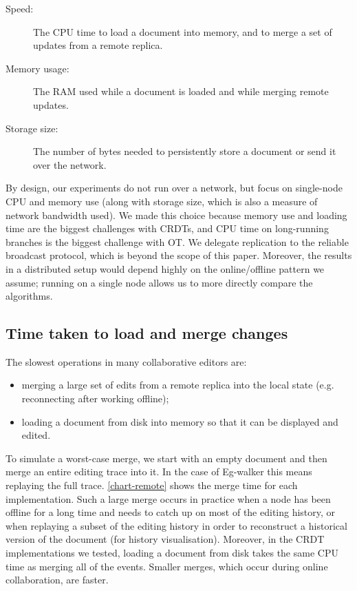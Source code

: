 \documentclass[sigplan,10pt]{acmart}
\newcommand{\algname}{Eg-walker\xspace}
\begin{document}
\begin{description}
\item[Speed:] The CPU time to load a document into memory, and to merge a set of updates from a remote replica.
\item[Memory usage:] The RAM used while a document is loaded and while merging remote updates.
\item[Storage size:] The number of bytes needed to persistently store a document or send it over the network.
\end{description}

By design, our experiments do not run over a network, but focus on single-node CPU and memory use (along with storage size, which is also a measure of network bandwidth used).
We made this choice because memory use and loading time are the biggest challenges with CRDTs, and CPU time on long-running branches is the biggest challenge with OT.
We delegate replication to the reliable broadcast protocol, which is beyond the scope of this paper.
Moreover, the results in a distributed setup would depend highly on the online/offline pattern we assume; running on a single node allows us to more directly compare the algorithms.


\subsection{Time taken to load and merge changes}

The slowest operations in many collaborative editors are:
\begin{itemize}
\item merging a large set of edits from a remote replica into the local state (e.g. reconnecting after working offline);
\item loading a document from disk into memory so that it can be displayed and edited.
\end{itemize}

To simulate a worst-case merge, we start with an empty document and then merge an entire editing trace into it.
In the case of \algname this means replaying the full trace.
\autoref{chart-remote} shows the merge time for each implementation.
Such a large merge occurs in practice when a node has been offline for a long time and needs to catch up on most of the editing history, or when replaying a subset of the editing history in order to reconstruct a historical version of the document (for history visualisation).
Moreover, in the CRDT implementations we tested, loading a document from disk takes the same CPU time as merging all of the events.
Smaller merges, which occur during online collaboration, are faster.
\end{document}
